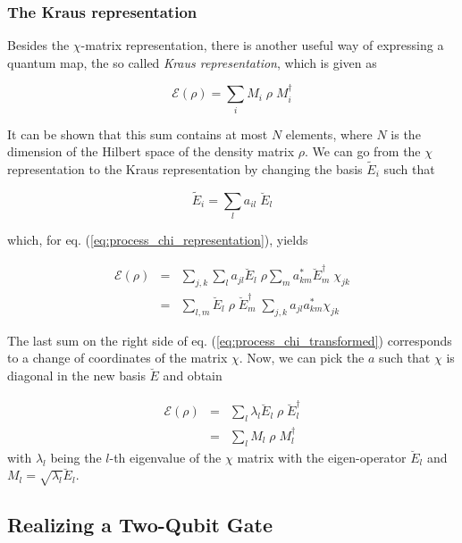 \subsubsection{The Kraus representation}

Besides the $\chi$-matrix representation, there is another useful way of expressing a quantum map, the so called {\it Kraus representation}, which is given as

\begin{equation}
 \mathcal{E}(\rho) = \sum\limits_i M_i \; \rho \; M_i^\dagger \label{eq:process_kraus_representation}
\end{equation}

It can be shown \citep{haroche_exploring_2006} that this sum contains at most $N$ elements, where $N$ is the dimension of the Hilbert space of the density matrix $\rho$. We can go from the $\chi$ representation to the Kraus representation by changing the basis $\tilde{E}_i$ such that

\begin{equation}
	\tilde{E}_i = \sum\limits_l a_{il}\; \breve{E}_l
\end{equation}

which, for eq. (\ref{eq:process_chi_representation}), yields

\begin{eqnarray}
 \mathcal{E}(\rho) & = & \sum\limits_{j,k} \sum\limits_l a_{jl} \breve{E}_l \; \rho \sum\limits_m a_{km}^* \breve{E}_m^\dagger \; \chi_{jk} \\
 & = & \sum\limits_{l,m}  \breve{E}_l \; \rho \; \breve{E}_m^\dagger \; \sum\limits_{j,k} a_{jl} a_{km}^* \chi_{jk} \label{eq:process_chi_transformed}
\end{eqnarray}

The last sum on the right side of eq. (\ref{eq:process_chi_transformed}) corresponds to a change of coordinates of the matrix $\chi$. Now, we can pick the $a$ such that $\chi$ is diagonal in the new basis $\breve{E}$ and obtain

\begin{eqnarray}
 \mathcal{E}(\rho) & = &  \sum\limits_{l} \lambda_l \breve{E}_l \; \rho \; \breve{E}_l^\dagger \\
& = &  \sum\limits_{l} M_l \; \rho \; M_l^\dagger
\end{eqnarray}
with $\lambda_l$ being the $l$-th eigenvalue of the $\chi$ matrix with the eigen-operator $\breve{E}_l$ and $M_{l} = \sqrt{\lambda_l} \breve{E}_l$.


\subsection{Realizing a Two-Qubit Gate}


